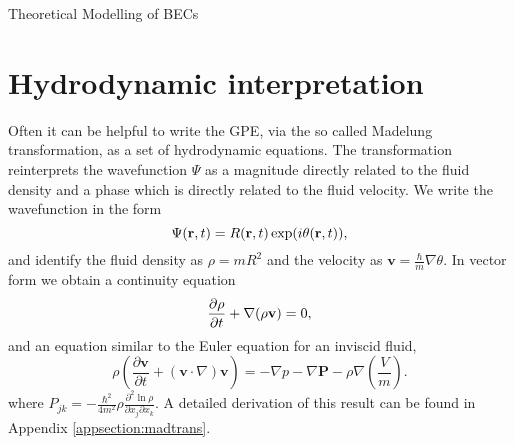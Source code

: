 \begin{chapter}{\label{cha:theoretical_model}Theoretical Modelling of BECs}
\section{\label{section:hydrodynamic} Hydrodynamic interpretation}
	Often it can be helpful to write the GPE, via the so called Madelung transformation, as a set of hydrodynamic equations. The transformation reinterprets the wavefunction $\Psi$ as a magnitude directly related to the fluid density and a phase which is directly related to the fluid velocity. We write the wavefunction in the form
	\begin{equation}
		\Psi({\bf r},t) = R({\bf r},t)\exp (i\theta({\bf r},t)),
	\end{equation}
	 and identify the fluid density as $\rho=mR^2$ and the velocity as $\mathbf{v} = \frac{\hbar}{m}\nabla\theta$.
	In vector form we obtain a continuity equation
	\begin{equation}
	  \frac{\partial \rho}{\partial t} + \nabla(\rho{\bf v}) = 0,
	  \label{eq:MTcont}
	\end{equation}
	and an equation similar to the Euler equation for an inviscid fluid,
	\begin{equation}
	\rho\left( \frac{\partial \mathbf{v}}{\partial t} + \left( \mathbf{v} \cdot \nabla \right)\mathbf{v} \right) = -\nabla p - \nabla \mathbf{P} - \rho \nabla \left(\frac{V}{m}\right).
	\end{equation}
	where $P_{jk} = -\frac{\hbar^2}{4m^2}\rho\frac{\partial^2\ln{\rho}}{\partial x_j \partial x_k}$.
	A detailed derivation of this result can be found in Appendix \ref{appsection:madtrans}.


\end{chapter}
